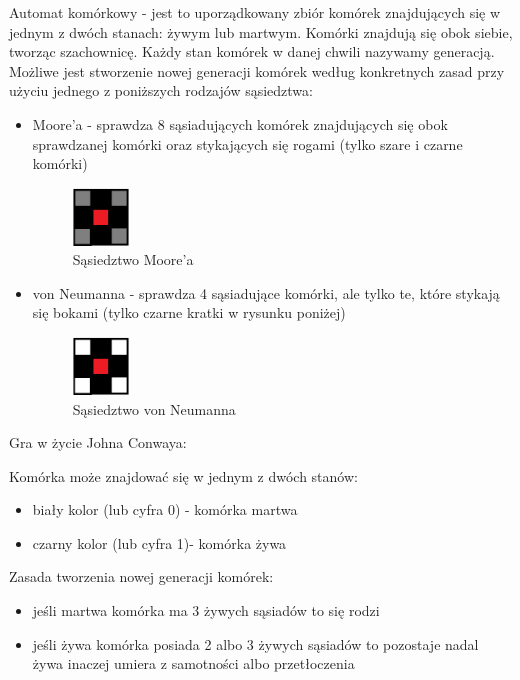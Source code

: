 \documentclass{article}
\begin{document}
{\fontsize{14}{14}\selectfont
Automat komórkowy - 
jest to uporządkowany zbiór komórek znajdujących się w jednym z dwóch stanach: żywym lub martwym.
Komórki znajdują się obok siebie, tworząc szachownicę. 
Każdy stan komórek w danej chwili nazywamy generacją. Możliwe jest stworzenie nowej generacji komórek według konkretnych zasad przy użyciu jednego z poniższych rodzajów sąsiedztwa:
\newline 
\newline
\begin{itemize}
\item Moore'a - sprawdza 8 sąsiadujących komórek znajdujących się obok sprawdzanej komórki oraz stykających się rogami (tylko szare i czarne komórki)

\begin{figure}[h]
\centering
\includegraphics[width=1.5cm]{Moor.png}
\caption{Sąsiedztwo Moore'a}
\label{fig:obrazek MOOR.png}
\end{figure}
\item von Neumanna - sprawdza 4 sąsiadujące komórki, ale tylko te, które stykają się bokami (tylko czarne kratki w rysunku poniżej)

\begin{figure}[h]
\centering
\includegraphics[width=1.5cm]{Neumann.png}
\caption{Sąsiedztwo von Neumanna}
\label{fig:obrazek Neumann.png}
\end{figure}
\end{itemize}

\begin{description}
\item[Gra w życie Johna Conwaya:]
\end{description}
Komórka może znajdować się w jednym z dwóch stanów:
\begin{itemize}
\item biały kolor (lub cyfra 0) - komórka martwa
\item czarny kolor (lub cyfra 1)- komórka żywa 
\end{itemize}
Zasada tworzenia nowej generacji komórek:
\begin{itemize}
\item jeśli martwa komórka ma 3 żywych sąsiadów to się rodzi
\item jeśli żywa komórka posiada 2 albo 3 żywych sąsiadów to pozostaje nadal żywa inaczej umiera z samotności albo przetłoczenia 
\end{itemize}
}
\end{document}
